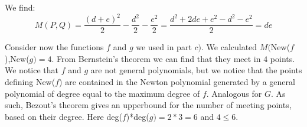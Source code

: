 \documentclass[paper=a4, fontsize=11pt]{scrartcl} %
\theoremstyle{plain}
\begin{document}
We find: 
\[M(P,Q)= \frac{(d+e)^{2}}{2} - \frac{d^{2}}{2} -\frac{e^{2}}{2}= \frac{d^{2} + 2de + e^{2}-d^{2}-e^{2}}{2}=de\]


Consider now the functions $f$ and $g$ we used in part $c)$. We calculated $M($New($f$),New($g)=4$. From Bernstein's theorem we can find that they meet in $4$ points. We notice that $f$ and $g$ are not general polynomials, but we notice that the points defining New($f$) are contained in the Newton polynomial generated by a general polynomial of degree equal to the maximum degree of $f$. Analogous for $G$. As such, Bezout's theorem gives an upperbound for the number of meeting points, based on their degree. Here deg($f$)*deg($g)=2*3=6$ and $4\leq 6$.
\end{document}
